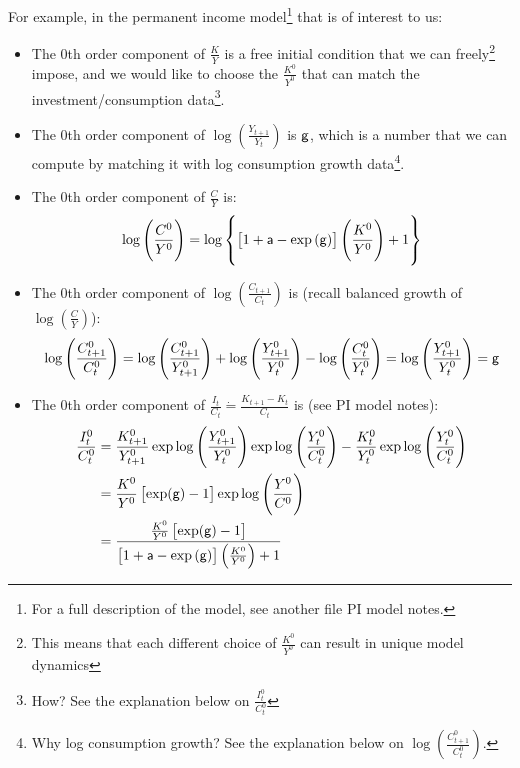 \documentclass[12pt]{article}
\theoremstyle{definition}
\theoremstyle{remark}
\begin{document}
For example, in the permanent income model\footnote{For a full description of the model, see another file PI model notes.} that is of interest to us:
\begin{itemize}
	\item The 0th order component of $\frac{K}{Y}$ is a free initial condition that we can freely\footnote{This means that each different choice of $\frac{K^0}{Y^0}$ can result in unique model dynamics} impose, and we would like to choose the $\frac{K^0}{Y^0}$ that can match the investment/consumption data\footnote{How? See the explanation below on $\frac{I_t^0}{C_t^0}$}.
	\item The 0th order component of $\log\left(\frac{Y_{t+1}}{Y_t}\right)$ is ${\sf g}$, which is a number that we can compute by matching it with log consumption growth data\footnote{Why log consumption growth? See the explanation below on $\log\left(\frac{C_{t+1}^0}{C_t^0}\right)$.}.
	\item The 0th order component of $\frac{C}{Y}$ is:
\begin{equation*}
	\log \left(\frac{C^0}{Y^0}\right) = \log \left\{\left[1+{\sf a} - \exp \left(\sf g \right) \right]\left(\frac{K^0}{Y^0}\right) + 1 \right\}
\end{equation*}
	\item The 0th order component of $\log\left(\frac{C_{t+1}}{C_t}\right)$ is (recall balanced growth of $\log\left(\frac{C}{Y}\right)$):
\begin{equation*}
	\log\left(\frac{C_{t+1}^0}{C_t^0}\right) = \log\left(\frac{C_{t+1}^0}{Y_{t+1}^0}\right) + \log\left(\frac{Y_{t+1}^0}{Y_t^0}\right) - \log\left(\frac{C_{t}^0}{Y_{t}^0}\right) = \log\left(\frac{Y_{t+1}^0}{Y_t^0}\right) = {\sf g}
\end{equation*}
	\item The 0th order component of $\frac{I_t}{C_t} \dot{=} \frac{K_{t+1}-K_t}{C_t}$ is (see PI model notes):
\begin{align*}
    \frac{I_t^0}{C_t^0} &= \frac{K_{t+1}^0}{Y_{t+1}^0} \exp \log\left(\frac{Y_{t+1}^0}{Y_t^0}\right) \exp \log\left(\frac{Y_{t}^0}{C_t^0}\right) - \frac{K_{t}^0}{Y_{t}^0} \exp \log\left(\frac{Y_{t}^0}{C_t^0}\right)\\
     &= \frac{K^0}{Y^0} \left[\exp({\sf g}) - 1\right] \exp\log\left(\frac{Y^0}{C^0}\right)\\
     &= \frac{\frac{K^0}{Y^0} \left[\exp({\sf g}) - 1\right]}{\left[1+{\sf a} - \exp \left(\sf g \right) \right]\left(\frac{K^0}{Y^0}\right) + 1}
\end{align*}
\end{itemize}
\end{document}
